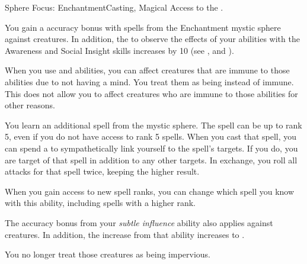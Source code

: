     \begin{magicalfeat}{Sphere Focus: Enchantment}{Casting, Magical}
        \featpre Access to the  .

         You gain a  accuracy bonus with spells from the Enchantment mystic sphere against \unaware creatures.
        In addition, the  to observe the effects of your  abilities with the Awareness and Social Insight skills increases by 10 (see , and ).

         When you use  and  abilities, you can affect creatures that are immune to those abilities due to not having a mind.
        You treat them as being \impervious instead of immune.
        This does not allow you to affect creatures who are immune to those abilities for other reasons.

         You learn an additional  spell from the  mystic sphere.
        The spell can be up to rank 5, even if you do not have access to rank 5 spells.
        When you cast that spell, you can spend a  to sympathetically link yourself to the spell's targets.
        If you do, you are target of that spell in addition to any other targets.
        In exchange, you roll all attacks for that spell twice, keeping the higher result.

        When you gain access to new spell ranks, you can change which spell you know with this ability, including spells with a higher rank.

         The accuracy bonus from your \textit{subtle influence} ability also applies against \partiallyunaware creatures.
        In addition, the  increase from that ability increases to .

         You no longer treat those creatures as being impervious.
    \end{magicalfeat}

